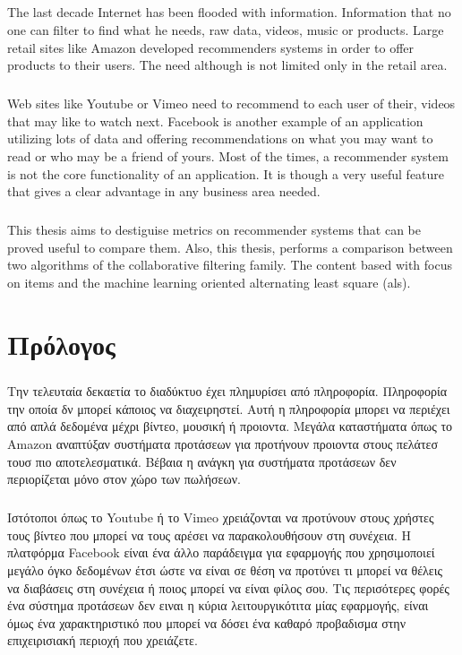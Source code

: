 \documentclass[12pt, a4paper, oneside, greek]{report}
\begin{document}
\paragraph{} The last decade Internet has been flooded with information. Information that no one can filter to find what he needs, raw data, videos, music or products. Large retail sites like Amazon developed recommenders systems in order to offer products to their users. The need although is not limited only in the retail area. 
\paragraph{}Web sites like Youtube or Vimeo need to recommend to each user of their, videos that may like to watch next. Facebook is another example of an application utilizing lots of data and offering recommendations on what you may want to read or who may be a friend of yours. Most of the times, a recommender system is not the core functionality of an application. It is though a very useful feature that gives a clear advantage in any business area needed.

\paragraph{} This thesis aims to destiguise metrics on recommender systems  that can be proved useful to compare them. Also, this thesis, performs a comparison between two algorithms of the collaborative filtering family. The content based with focus on items and the machine learning oriented alternating least square (als).
\newpage
\chapter*{Πρόλογος}
\paragraph{} Την τελευταία δεκαετία το διαδύκτυο έχει πλημυρίσει από πληροφορία. Πληροφορία την οποία δν μπορεί κάποιος να διαχειρηστεί. Αυτή η πληροφορία μπορει να περιέχει από απλά δεδομένα μέχρι βίντεο, μουσική ή προιοντα. Μεγάλα καταστήματα όπως το Amazon αναπτύξαν συστήματα προτάσεων για προτήνουν προιοντα στους πελάτεσ τουσ πιο αποτελεσματικά. Βέβαια η ανάγκη για συστήματα προτάσεων δεν περιορίζεται μόνο στον χώρο των πωλήσεων.

\paragraph{} Ιστότοποι όπως το Youtube ή το Vimeo χρειάζονται να προτύνουν στους χρήστες τους βίντεο που μπορεί να τους αρέσει να παρακολουθήσουν στη συνέχεια. Η πλατφόρμα Facebook είναι ένα άλλο παράδειγμα για εφαρμογής που χρησιμοποιεί μεγάλο όγκο δεδομένων έτσι ώστε να είναι σε θέση να προτύνει τι μπορεί να θέλεις να διαβάσεις στη συνέχεια ή ποιος μπορεί να είναι φίλος σου. Τις περισότερες φορές ένα σύστημα προτάσεων δεν ειναι η κύρια λειτουργικότιτα μίας εφαρμογής, είναι όμως ένα χαρακτηριστικό που μπορεί να δόσει ένα καθαρό προβαδισμα στην επιχειρισιακή περιοχή που χρειάζετε.
\end{document}
